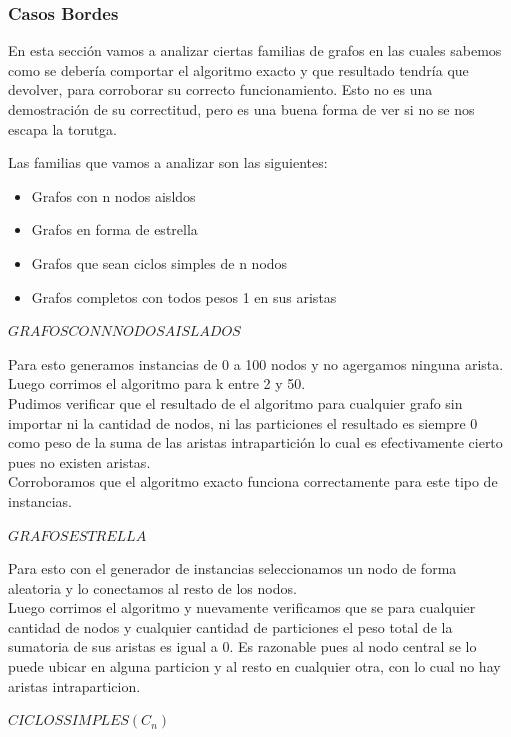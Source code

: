 \subsubsection{Casos Bordes}

En esta secci\'on vamos a analizar ciertas familias de grafos en las cuales sabemos como se deber\'ia comportar el algoritmo exacto y que resultado tendr\'ia que devolver, para corroborar su correcto funcionamiento.
Esto no es una demostraci\'on de su correctitud, pero es una buena forma de ver si no se nos escapa la torutga.

Las familias que vamos a analizar son las siguientes:

\begin{itemize}
	\item Grafos con n nodos aisldos
	\item Grafos en forma de estrella
	\item Grafos que sean ciclos simples de n nodos
	\item Grafos completos con todos pesos 1 en sus aristas
\end{itemize}

$GRAFOS CON N NODOS AISLADOS$



Para esto generamos instancias de 0 a 100 nodos y no agergamos ninguna arista. Luego corrimos el algoritmo para k entre 2 y 50.\\
Pudimos verificar que el resultado de el algoritmo para cualquier grafo sin importar ni la cantidad de nodos, ni las particiones el resultado es siempre 0 como peso de la suma de las aristas intrapartici\'on lo cual es efectivamente cierto pues no existen aristas.\\

Corroboramos que el algoritmo exacto funciona correctamente para este tipo de instancias.

$GRAFOS ESTRELLA$

Para esto con el generador de instancias seleccionamos un nodo de forma aleatoria y lo conectamos al resto de los nodos.\\
Luego corrimos el algoritmo y nuevamente verificamos que se para cualquier cantidad de nodos y cualquier cantidad de particiones el peso total de la sumatoria de sus aristas es igual a 0.
Es razonable pues al nodo central se lo puede ubicar en alguna particion y al resto en cualquier otra, con lo cual no hay aristas intraparticion.

$CICLOS SIMPLES (C_n)$


